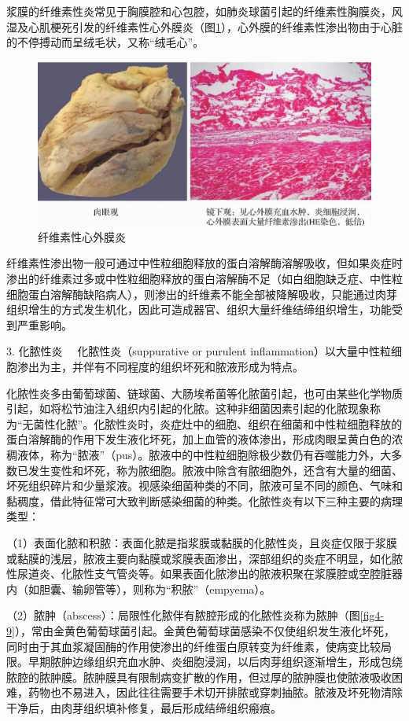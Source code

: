 浆膜的纤维素性炎常见于胸膜腔和心包腔，如肺炎球菌引起的纤维素性胸膜炎，风湿及心肌梗死引发的纤维素性心外膜炎（图\ref{fig4-8}），心外膜的纤维素性渗出物由于心脏的不停搏动而呈绒毛状，又称“绒毛心”。

\begin{figure}[!htbp]
 \centering
 \includegraphics{./images/Image00059.jpg}
 \caption{纤维素性心外膜炎}
 \label{fig4-8}
  \end{figure} 

纤维素性渗出物一般可通过中性粒细胞释放的蛋白溶解酶溶解吸收，但如果炎症时渗出的纤维素过多或中性粒细胞释放的蛋白溶解酶不足（如白细胞缺乏症、中性粒细胞蛋白溶解酶缺陷病人），则渗出的纤维素不能全部被降解吸收，只能通过肉芽组织增生的方式发生机化，因此可造成器官、组织大量纤维结缔组织增生，功能受到严重影响。

{3. 化脓性炎} 　化脓性炎（suppurative or purulent
inflammation）以大量中性粒细胞渗出为主，并伴有不同程度的组织坏死和脓液形成为特点。

化脓性炎多由葡萄球菌、链球菌、大肠埃希菌等化脓菌引起，也可由某些化学物质引起，如将松节油注入组织内引起的化脓。这种非细菌因素引起的化脓现象称为“无菌性化脓”。化脓性炎时，炎症灶中的细胞、组织在细菌和中性粒细胞释放的蛋白溶解酶的作用下发生液化坏死，加上血管的液体渗出，形成肉眼呈黄白色的浓稠液体，称为“脓液”（pus）。脓液中的中性粒细胞除极少数仍有吞噬能力外，大多数已发生变性和坏死，称为脓细胞。脓液中除含有脓细胞外，还含有大量的细菌、坏死组织碎片和少量浆液。视感染细菌种类的不同，脓液可呈不同的颜色、气味和黏稠度，借此特征常可大致判断感染细菌的种类。化脓性炎有以下三种主要的病理类型：

（1）表面化脓和积脓：表面化脓是指浆膜或黏膜的化脓性炎，且炎症仅限于浆膜或黏膜的浅层，脓液主要向黏膜或浆膜表面渗出，深部组织的炎症不明显，如化脓性尿道炎、化脓性支气管炎等。如果表面化脓渗出的脓液积聚在浆膜腔或空腔脏器内（如胆囊、输卵管等），则称为“积脓”（empyema）。

（2）脓肿（abscess）：局限性化脓伴有脓腔形成的化脓性炎称为脓肿（图\ref{fig4-9}），常由金黄色葡萄球菌引起。金黄色葡萄球菌感染不仅使组织发生液化坏死，同时由于其血浆凝固酶的作用使渗出的纤维蛋白原转变为纤维素，使病变比较局限。早期脓肿边缘组织充血水肿、炎细胞浸润，以后肉芽组织逐渐增生，形成包绕脓腔的脓肿膜。脓肿膜具有限制病变扩散的作用，但过厚的脓肿膜也使脓液吸收困难，药物也不易进入，因此往往需要手术切开排脓或穿刺抽脓。脓液及坏死物清除干净后，由肉芽组织填补修复，最后形成结缔组织瘢痕。

